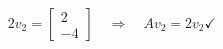 \documentclass{article}
\begin{document}
\begin{align*}
2v_2 = \begin{bmatrix}2\\-4\end{bmatrix}\quad \Rightarrow \quad \boxed{Av_2 = 2v_2} \checkmark
\end{align*}
\end{document}
